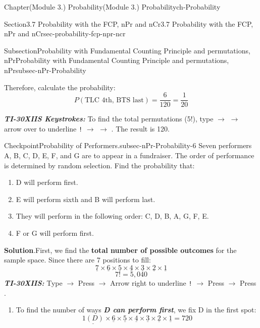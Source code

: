\documentclass[oneside,10pt,]{book}
\newcommand{\blocktitlefont}{\relax}
\newcommand{\mono}[1]{\texttt{#1}}
\newcommand{\alert}[1]{\textbf{\textit{#1}}}
\newcommand{\terminology}[1]{\textbf{#1}}
\newcommand{\kbd}[1]{\keys{{#1}}}
\begin{document}
\begin{chapterptx}{Chapter}{(Module 3.) Probability}{}{(Module 3.) Probability}{}{}{ch-Probability}
\begin{sectionptx}{Section}{3.7 Probability with the FCP, nPr and nCr}{}{3.7 Probability with the FCP, nPr and nCr}{}{}{sec-probability-fcp-npr-ncr}
\begin{subsectionptx}{Subsection}{Probability with Fundamental Counting Principle and permutations, nPr}{}{Probability with Fundamental Counting Principle and permutations, nPr}{}{}{subsec-nPr-Probability}
%
\par
Therefore, calculate the probability:%
\begin{equation*}
P(\text{TLC 4th, BTS last}) = \frac{6}{120} = \frac{1}{20}
\end{equation*}
%
\par
\alert{TI-30XIIS Keystrokes:} To find the total permutations (5!), type \kbd{5} \(\rightarrow\) \kbd{PRB} \(\rightarrow\) arrow over to underline \mono{!} \(\rightarrow\) \kbd{ENTER} \(\rightarrow\) \kbd{ENTER}. The result is 120.%
\begin{inlineexercise}{Checkpoint}{Probability of Performers.}{subsec-nPr-Probability-6}%
Seven performers A, B, C, D, E, F, and G are to appear in a fundraiser. The order of performance is determined by random selection. Find the probability that:%
\par
%
\begin{enumerate}[label={\alph*}]
\item{}D will perform first.%
\item{}E will perform sixth and B will perform last.%
\item{}They will perform in the following order: C, D, B, A, G, F, E.%
\item{}F or G will perform first.%
\end{enumerate}
%
\par\smallskip%
\noindent\textbf{\blocktitlefont Solution}.\hypertarget{subsec-nPr-Probability-6-3}{}\quad{}First, we find the \terminology{total number of possible outcomes} for the sample space. Since there are 7 positions to fill:%
\begin{equation*}
\underline{7} \times \underline{6} \times \underline{5} \times \underline{4} \times \underline{3} \times \underline{2} \times \underline{1}
\end{equation*}
%
\begin{equation*}
7! = 5{,}040
\end{equation*}
\alert{TI-30XIIS:} Type \kbd{7} \(\rightarrow\) Press \kbd{PRB} \(\rightarrow\) Arrow right to underline \mono{!} \(\rightarrow\) Press \kbd{ENTER} \(\rightarrow\) Press \kbd{ENTER}.%
%
\par
%
\begin{enumerate}[label={\alph*}]
\item{}To find the number of ways \alert{D can perform first}, we fix D in the first spot:%
\begin{equation*}
\underline{1 (D)} \times \underline{6} \times \underline{5} \times \underline{4} \times \underline{3} \times \underline{2} \times \underline{1} = 720

\end{equation*}
\end{enumerate}
\end{inlineexercise}
\end{subsectionptx}
\end{sectionptx}
\end{chapterptx}
\end{document}
